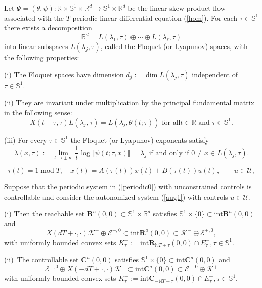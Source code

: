 \documentclass[10pt,a4paper]{amsart}
\begin{document}
\begin{theorem}
\label{Theorem7.1.7}Let $\Psi=(\theta,\psi):\mathbb{R}\times\mathbb{S}%
^{1}\times\mathbb{R}^{d}\longrightarrow\mathbb{S}^{1}\times\mathbb{R}^{d}$ be
the linear skew product flow associated with the $T$-periodic linear
differential equation (\ref{hom}). For each $\tau\in\mathbb{S}^{1}$ there
exists a decomposition%
\[
\mathbb{R}^{d}=L(\lambda_{1},\tau)\oplus\cdots\oplus L(\lambda_{\ell},\tau)
\]
into linear subspaces $L(\lambda_{j},\tau)$, called the Floquet (or Lyapunov)
spaces, with the following properties:

(i) The Floquet spaces have dimension $d_{j}:=\dim L(\lambda_{j},\tau)$
independent of $\tau\in\mathbb{S}^{1}$.

(ii) They are invariant under multiplication by the principal fundamental
matrix in the following sense:
\[
X(t+\tau,\tau)L(\lambda_{j},\tau)=L(\lambda_{j},\theta(t;\tau))\text{ for all
}t\in\mathbb{R}\text{ and }\tau\in\mathbb{S}^{1}.
\]


(iii) For every $\tau\in\mathbb{S}^{1}$ the Floquet (or Lyapunov) exponents
satisfy%
\[
\lambda(x,\tau):=\lim_{t\rightarrow\pm\infty}\frac{1}{t}\log\Vert\psi
(t;\tau,x)\Vert=\lambda_{j}\text{ if and only if }0\not =x\in L(\lambda
_{j},\tau).
\]

\end{theorem}

\begin{equation}
\dot{\tau}(t)=1\operatorname{mod}T,\quad\dot{x}(t)=A(\tau(t))x(t)+B(\tau
(t))u(t),\qquad u\in\mathcal{U}, \label{aug1}%
\end{equation}

\begin{theorem}
\label{Theorem_sub}Suppose that the periodic system in (\ref{periodic0}) with
unconstrained controls is controllable and consider the autonomized system
(\ref{aug1}) with controls $u\in\mathcal{U}$.

(i) Then the reachable set $\mathbf{R}^{a}(0,0)\subset\mathbb{S}^{1}%
\times\mathbb{R}^{d}$ satisfies $\mathbb{S}^{1}\times\{0\}\subset
\mathrm{int}\mathbf{R}^{a}(0,0)$ and%
\[
X(dT+\cdot,\cdot)\mathcal{K}^{-}\oplus\mathcal{E}^{+,0}\subset\mathrm{int}%
\mathbf{R}^{a}(0,0)\subset\mathcal{K}^{-}\oplus\mathcal{E}^{+,0},
\]
with uniformly bounded convex sets $K_{\tau}^{-}:=\mathrm{int}\mathbf{R}%
_{\mathbb{N}T+\tau}(0,0)\cap E_{\tau}^{-},\tau\in\mathbb{S}^{1}$.

(ii)\ The controllable set $\mathbf{C}^{a}(0,0)$ satisfies $\mathbb{S}%
^{1}\times\{0\}\subset\mathrm{int}\mathbf{C}^{a}(0,0)$ and%
\[
\mathcal{E}^{-,0}\oplus X(-dT+\cdot,\cdot)\mathcal{K}^{+}\subset
\mathrm{int}\mathbf{C}^{a}(0,0)\subset\mathcal{E}^{-,0}\oplus\mathcal{K}^{+}%
\]
with uniformly bounded convex sets $K_{\tau}^{+}:=\mathrm{int}\mathbf{C}%
_{-\mathbb{N}T+\tau}(0,0)\cap E_{\tau}^{+},\tau\in\mathbb{S}^{1}$.
\end{theorem}
\end{document}
